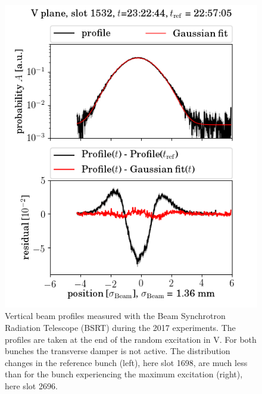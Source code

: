 \documentclass[%
 reprint,
 amsmath,amssymb,
 aps,
prstab,
]{revtex4-1}
\begin{document}
\begin{figure}[h]
\begin{minipage}[t]{0.49\linewidth}
		\includegraphics[width=1.0\linewidth]{profile_v_ranv_slot_1532.png}
	\end{minipage}
	\caption{\label{fig:ranexpprof}Vertical beam profiles measured with the Beam Synchrotron Radiation Telescope (BSRT) during the 2017 experiments. The profiles are taken at the end of the random excitation in V. For both bunches the transverse damper is not active. The distribution changes in the reference bunch (left), here slot 1698, are much less than for the bunch experiencing the maximum excitation (right), here slot 2696.}
\end{figure}
\end{document}
